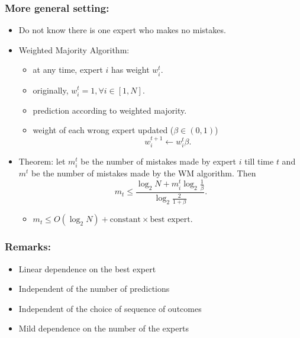 \documentclass{beamer}
\begin{document}
\begin{frame}
\frametitle{More general setting:}
\begin{itemize}
\item Do not know there is one expert who makes no mistakes. 
\pause
\item Weighted Majority Algorithm:
\begin{itemize}
	\item at any time, expert $i$ has weight $w_i^t$.
	\item originally, $w_i^t = 1, \forall i\in[1,N]$.
	\item prediction according to weighted majority. 
	\item weight of each wrong expert updated ($\beta\in(0,1)$)
	$$w_i^{t+1}\leftarrow w_i^t\beta.$$
\end{itemize}
\pause
\item Theorem: let $m_i^t$ be the number of mistakes made by expert $i$ till time $t$ and $m^t$ be the number of mistakes made by the WM algorithm. Then
$$m_t \le \frac{\log_2 N+m_i^t\log_2\frac{1}{\beta}}{\log_2 \frac{2}{1+\beta}}.$$
\begin{itemize}
\item $m_t\le O(\log_2 N)+\text{constant}\times\text{best expert}$.
\end{itemize}

\end{itemize}
\end{frame}


\begin{frame}
\frametitle{Remarks:}
\begin{itemize}
\item Linear dependence on the best expert
\pause
\item Independent of the number of predictions
\pause
\item Independent of the choice of sequence of outcomes
\pause
\item Mild dependence on the number of the experts
\end{itemize}


\end{frame}
\end{document}
